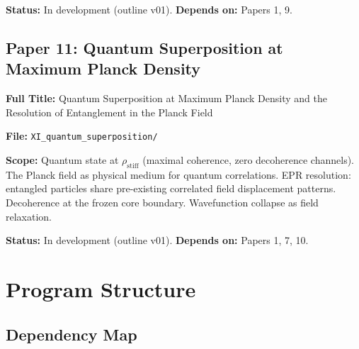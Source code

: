 \documentclass[11pt,a4paper]{article}
\newcommand{\rhostiff}{\ensuremath{\rho_{\mathrm{stiff}}}}
\begin{document}
\textbf{Status:} In development (outline v01). \quad \textbf{Depends on:} Papers 1, 9.

\subsection{Paper 11: Quantum Superposition at Maximum Planck Density}
\label{sec:paper11}

\textbf{Full Title:} Quantum Superposition at Maximum Planck Density and the Resolution of Entanglement in the Planck Field

\textbf{File:} \texttt{XI\_quantum\_superposition/}

\textbf{Scope:} Quantum state at $\rhostiff$ (maximal coherence, zero decoherence channels). The Planck field as physical medium for quantum correlations. EPR resolution: entangled particles share pre-existing correlated field displacement patterns. Decoherence at the frozen core boundary. Wavefunction collapse as field relaxation.

\textbf{Status:} In development (outline v01). \quad \textbf{Depends on:} Papers 1, 7, 10.

\section{Program Structure}
\label{sec:structure}

\subsection{Dependency Map}
\end{document}

